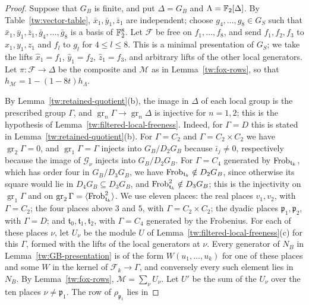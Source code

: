\begin{proof}
Suppose that $G_B$ is finite, and put $\Delta=G_B$ and
$\Lambda=\mathbb F_2[\Delta]$. By Table~\ref{tw:vector-table},
$\bar x_1,\bar y_1,\bar z_1$ are independent; choose
$g_4,\dots,g_8\in G_S$ such that
$\bar x_1,\bar y_1,\bar z_1,\bar g_4,\dots,\bar g_8$ is a basis of
$\mathbb F_2^8$. Let $\mathcal F$ be free on $f_1,\dots,f_8$, and send
$f_1,f_2,f_3$ to $x_1,y_1,z_1$ and $f_l$ to $g_l$ for $4\le l\le8$. This is a
minimal presentation of
$G_S$; we take the lifts $\hat x_1=f_1$, $\hat y_1=f_2$,
$\hat z_1=f_3$, and arbitrary lifts of the other local generators. Let
$\pi\colon\mathcal F\to\Delta$ be the composite and $\mathcal M$ as in
Lemma~\ref{tw:fox-rows}, so that $h_{\mathcal M}=1-(1-8t)h_\Lambda$.

By Lemma~\ref{tw:retained-quotient}(b), the image in $\Delta$ of each
local group is the prescribed group $\Gamma$, and
$\operatorname{gr}_n\Gamma\to\operatorname{gr}_n\Delta$ is injective for
$n=1,2$; this is the hypothesis of
Lemma~\ref{tw:filtered-local-freeness}. Indeed, for $\Gamma=D$ this is stated
in Lemma~\ref{tw:retained-quotient}(b). For $\Gamma=C_2$ and
$\Gamma=C_2\times C_2$ we have $\operatorname{gr}_2\Gamma=0$, and
$\operatorname{gr}_1\Gamma=\Gamma$ injects into $G_B/D_2G_B$ because
$\bar\iota_j\ne0$, respectively because the image of $\mathcal G_\nu$ injects
into $G_B/D_2G_B$. For $\Gamma=C_4$ generated by $\operatorname{Frob}_{\mathfrak t_k}$,
which has order four in $G_B/D_3G_B$, we have
$\operatorname{Frob}_{\mathfrak t_k}\notin D_2G_B$, since otherwise its square would lie in
$D_4G_B\subseteq D_3G_B$, and $\operatorname{Frob}_{\mathfrak t_k}^2\notin D_3G_B$; this is
the injectivity on $\operatorname{gr}_1\Gamma$ and on
$\operatorname{gr}_2\Gamma=\langle\operatorname{Frob}_{\mathfrak t_k}^2\rangle$. We use
eleven places: the real
places $v_1,v_2$, with $\Gamma=C_2$; the four places above $3$ and $5$, with
$\Gamma=C_2\times C_2$; the dyadic places $\mathfrak p_1,\mathfrak p_2$, with
$\Gamma=D$; and $\mathfrak t_0,\mathfrak t_1,\mathfrak t_2$, with $\Gamma=C_4$
generated by the Frobenius. For each of these places $\nu$, let $U_\nu$ be
the module $U$ of Lemma~\ref{tw:filtered-local-freeness}(c) for this $\Gamma$,
formed with the lifts of the local generators at $\nu$. Every generator of
$N_B$ in Lemma~\ref{tw:GB-presentation} is of the form $W(u_1,\dots,u_k)$ for
one of these places and some $W$ in the kernel of $\mathcal F_k\to\Gamma$, and
conversely every such element lies in $N_B$. By Lemma~\ref{tw:fox-rows},
$\mathcal M=\sum_\nu U_\nu$. Let $U'$ be the sum of the $U_\nu$ over the ten
places $\nu\ne\mathfrak p_1$. The row of $\rho_{\mathfrak p_1}$ lies in

\end{proof}
